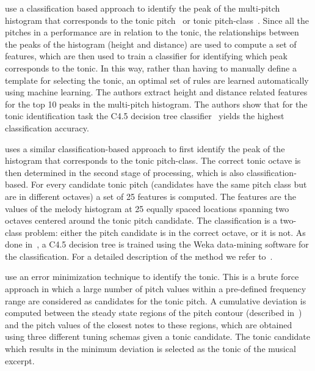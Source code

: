 \cite{salamon2012multipitch,gulati2012two} use a classification based approach to identify the peak of the multi-pitch histogram that corresponds to the tonic pitch~\citep{salamon2012multipitch} or tonic pitch-class~\citep{gulati2012two}. Since all the pitches in a performance are in relation to the tonic, the relationships between the peaks of the histogram (height and distance) are used to compute a set of features, which are then used to train a classifier for identifying which peak corresponds to the tonic. In this way, rather than having to manually define a template for selecting the tonic, an optimal set of rules are learned automatically using machine learning. The authors extract height and distance related features for the top 10 peaks in the multi-pitch histogram. The authors show that for the tonic identification task the C4.5 decision tree classifier~\citep{Quinlan:1993:CPM:152181} yields the highest classification accuracy. 

\cite{gulati2012two} uses a similar classification-based approach to first identify the peak of the histogram that corresponds to the tonic pitch-class. The correct tonic octave is then determined in the second stage of processing, which is also classification-based. For every candidate tonic pitch (candidates have the same pitch class but are in different octaves) a set of 25 features is computed. The features are the values of the melody histogram at 25 equally spaced locations spanning two octaves centered around the tonic pitch candidate. The classification is a two-class problem: either the pitch candidate is in the correct octave, or it is not. As done in~\cite{salamon2012multipitch}, a C4.5 decision tree is trained using the Weka data-mining software for the classification. For a detailed description of the method we refer to~\cite{SGulati_MThesis2012}.

\cite{Sengupta2005b} use an error minimization technique to identify the tonic. This is a brute force approach in which a large number of pitch values within a pre-defined frequency range are considered as candidates for the tonic pitch. A cumulative deviation is computed between the steady state regions of the pitch contour (described in~) and the pitch values of the closest notes to these regions, which are obtained using three different tuning schemas given a tonic candidate. The tonic candidate which results in the minimum deviation is selected as the tonic of the musical excerpt.

